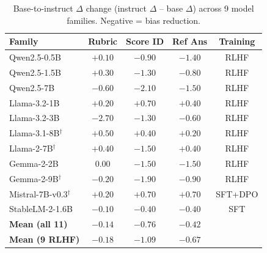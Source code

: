 \begin{table}[h]
\centering\small
\caption{Base-to-instruct $\Delta$ change (instruct $\Delta$ -- base $\Delta$) across 9 model families. Negative = bias reduction.}
\label{tab:delta_changes}
\begin{tabular}{lcccc}
\toprule
\textbf{Family} & \textbf{Rubric} & \textbf{Score ID} & \textbf{Ref Ans} & \textbf{Training} \\
\midrule
Qwen2.5-0.5B & $+0.10$ & $-0.90$ & $-1.40$ & RLHF \\
Qwen2.5-1.5B & $+0.30$ & $-1.30$ & $-0.80$ & RLHF \\
Qwen2.5-7B & $-0.60$ & $-2.10$ & $-1.50$ & RLHF \\
Llama-3.2-1B & $+0.20$ & $+0.70$ & $+0.40$ & RLHF \\
Llama-3.2-3B & $-2.70$ & $-1.30$ & $-0.60$ & RLHF \\
Llama-3.1-8B$^\dagger$ & $+0.50$ & $+0.40$ & $+0.20$ & RLHF \\
Llama-2-7B$^\dagger$ & $+0.40$ & $-1.50$ & $+0.40$ & RLHF \\
Gemma-2-2B & $0.00$ & $-1.50$ & $-1.50$ & RLHF \\
Gemma-2-9B$^\dagger$ & $-0.20$ & $-1.90$ & $-0.90$ & RLHF \\
Mistral-7B-v0.3$^\dagger$ & $+0.20$ & $+0.70$ & $+0.70$ & SFT+DPO \\
StableLM-2-1.6B & $-0.10$ & $-0.40$ & $-0.40$ & SFT \\
\midrule
\textbf{Mean (all 11)} & $-0.14$ & $-0.76$ & $-0.42$ & \\
\textbf{Mean (9 RLHF)} & $-0.18$ & $-1.09$ & $-0.67$ & \\
\bottomrule
\end{tabular}
\par\vspace{2mm}
\end{table}
